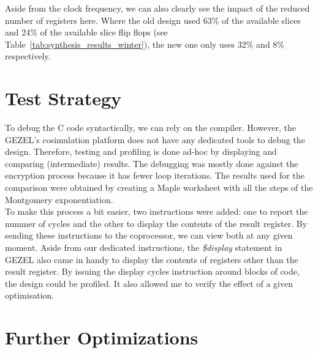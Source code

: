 \documentclass[a4paper]{article}
\begin{document}
Aside from the clock frequency, we can also clearly see the impact of the reduced number of registers here. Where the old design used 63\% of the available slices and 24\% of the available slice flip flops (see Table~\ref{tab:synthesis_results_winter}), the new one only uses 32\% and 8\% respectively.

\section{Test Strategy}

To debug the C code syntactically, we can rely on the compiler. However, the GEZEL's cosimulation platform does not have any dedicated tools to debug the design. Therefore, testing and profiling is done ad-hoc by displaying and comparing (intermediate) results. The debugging was mostly done against the encryption process because it has fewer loop iterations. The results used for the comparison were obtained by creating a Maple worksheet with all the steps of the Montgomery exponentiation.\\


To make this process a bit easier, two instructions were added: one to report the nummer of cycles and the other to display the contents of the result register. By sending these instructions to the coprocessor, we can view both at any given moment. Aside from our dedicated instructions, the \textit{\$display} statement in GEZEL also came in handy to display the contents of registers other than the result register. By issuing the display cycles instruction around blocks of code, the design could be profiled. It also allowed me to verify the effect of a given optimisation.

\section{Further Optimizations}
\end{document}
